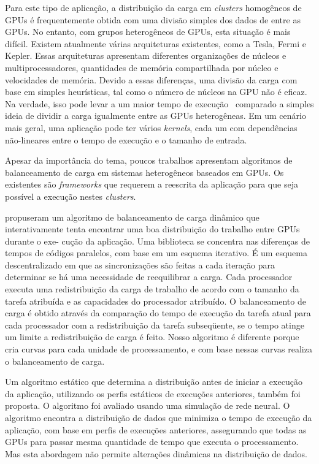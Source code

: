 Para este tipo de aplicação, a distribuição da carga em \emph{clusters}
homogêneos de GPUs é frequentemente obtida com uma divisão simples dos dados de
entre as GPUs. No entanto, com grupos heterogêneos de GPUs, esta situação é mais
difícil. Existem atualmente várias arquiteturas existentes, como a Tesla, Fermi
e Kepler. Essas arquiteturas apresentam diferentes organizações de núcleos e
multiprocessadores, quantidades de memória compartilhada por núcleo e
velocidades de memória. Devido a essas diferenças, uma divisão da carga com base
em simples heurísticas, tal como o número de núcleos na GPU não é eficaz. Na
verdade, isso pode levar a um maior tempo de execução~\cite{raphael} comparado a
simples ideia de dividir a carga igualmente entre as GPUs heterogêneas. Em um
cenário mais geral, uma aplicação pode ter vários \emph{kernels}, cada um com
dependências não-lineares entre o tempo de execução e o tamanho de entrada.

Apesar da importância do tema, poucos trabalhos apresentam algoritmos de
balanceamento de carga em sistemas heterogêneos baseados em GPUs. Os existentes
são \emph{frameworks} que requerem a reescrita da aplicação para que seja
possível a execução nestes \emph{clusters}.

\cite{acosta} propuseram um algoritmo de balanceamento de carga dinâmico que interativamente tenta encontrar uma boa distribuição do trabalho entre GPUs durante o exe- cução da aplicação. Uma biblioteca se concentra nas diferenças de tempos de códigos paralelos, com base em um esquema iterativo. É um esquema descentralizado em que as sincronizações são feitas a cada iteração para determinar se há uma necessidade de reequilibrar a carga. Cada processador executa uma redistribuição da carga de trabalho de acordo com o tamanho da tarefa atribuída e as capacidades do processador atribuído. O balanceamento de carga é obtido através da comparação do tempo de execução da tarefa atual para cada processador com a redistribuição da tarefa subseqüente, se o tempo atinge um limite a redistribuição de carga é feito. Nosso algoritmo é diferente porque cria curvas para cada unidade de processamento, e com base nessas curvas realiza o balanceamento de carga. 

Um algoritmo estático que determina a distribuição antes de iniciar a execução da aplicação, utilizando os perfis estáticos de execuções anteriores, também foi proposta\cite{raphael}. O algoritmo foi avaliado usando uma simulação de rede neural. O algoritmo encontra a distribuição de dados que minimiza o tempo de execução da aplicação, com base em perfis de execuções anteriores, assegurando que todas as GPUs para passar mesma quantidade de tempo que executa o processamento. Mas esta abordagem não permite alterações dinâmicas na distribuição de dados. 

